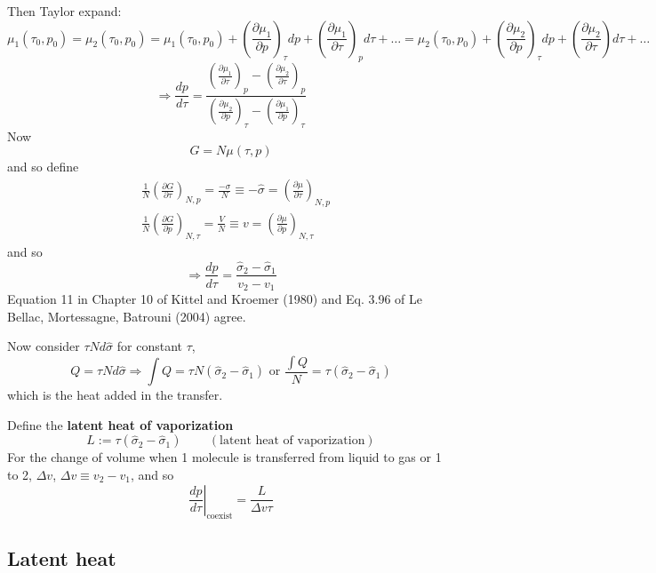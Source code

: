 \documentclass[10pt]{amsart}
\begin{document}
\begin{multicols*}{2}
Then Taylor expand:
\[
\mu_1(\tau_0,p_0) = \mu_2(\tau_0,p_0) = \mu_1(\tau_0,p_0) + \left( \frac{ \partial \mu_1}{ \partial p} \right)_{\tau} dp + \left( \frac{ \partial \mu_1}{ \partial \tau } \right)_p d\tau + \dots = \mu_2(\tau_0,p_0) + \left( \frac{ \partial \mu_2}{ \partial p} \right)_{\tau} dp + \left( \frac{ \partial \mu_2}{ \partial \tau} \right) d\tau + \dots
\]
\[
\Longrightarrow \frac{dp}{d\tau} = \frac{ \left( \frac{ \partial \mu_1}{ \partial \tau} \right)_p - \left( \frac{ \partial \mu_2}{ \partial \tau} \right)_p }{ \left( \frac{ \partial \mu_2}{ \partial p} \right)_{\tau} - \left( \frac{ \partial \mu_1}{ \partial p }\right)_{\tau}  }
\]
Now
\[
G= N\mu(\tau,p)
\]
and so define
\[
\begin{aligned}
  & \frac{1}{N} \left( \frac{ \partial G}{ \partial \tau} \right)_{N,p} = \frac{-\sigma}{N} \equiv - \widehat{\sigma} =  \left( \frac{ \partial \mu }{ \partial \tau} \right)_{N,p} \\
  & \frac{1}{N} \left( \frac{ \partial G}{ \partial p} \right)_{N,\tau} = \frac{V}{N} \equiv v =  \left( \frac{ \partial \mu }{ \partial p} \right)_{N,\tau} 
\end{aligned}
\]
and so
\[
\Longrightarrow \frac{dp}{d\tau} = \frac{ \widehat{\sigma}_2 - \widehat{\sigma}_1}{ v_2 - v_1}
\]
Equation 11 in Chapter 10 of Kittel and Kroemer (1980) \cite{CKittelHKroemer1980} and Eq. 3.96 of Le Bellac, Mortessagne, Batrouni (2004) \cite{MLeBellacFMortessagneGBatrouni2004} agree. 

Now consider $\tau N d\widehat{\sigma}$ for constant $\tau$, 
\[
Q = \tau N d\widehat{\sigma} \Longrightarrow \int Q = \tau N( \widehat{\sigma}_2 - \widehat{\sigma}_1) \text{ or } \frac{ \int Q}{ N} = \tau (\widehat{\sigma}_2 - \widehat{\sigma}_1 ) 
\]
which is the heat added in the transfer.  

Define the \textbf{latent heat of vaporization}
\begin{equation}
  L := \tau(\widehat{\sigma}_2 - \widehat{\sigma}_1) \qquad \, (\text{latent heat of vaporization})
\end{equation}
For the change of volume when 1 molecule is transferred from liquid to gas or 1 to 2, $\Delta v$, $\Delta v \equiv v_2 - v_1$, and so 
\begin{equation}
\left. \frac{dp}{d\tau } \right|_{\text{coexist}} = \frac{L }{ \Delta v \tau}
\end{equation}


\subsection{Latent heat}


\end{multicols*}
\end{document}
